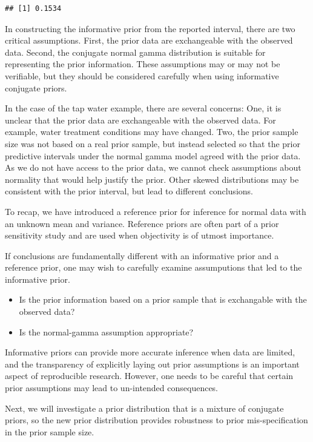 \documentclass[]{book}
\theoremstyle{definition}
\theoremstyle{definition}
\theoremstyle{definition}
\theoremstyle{remark}
\begin{document}
\begin{verbatim}
## [1] 0.1534
\end{verbatim}

In constructing the informative prior from the reported interval, there
are two critical assumptions. First, the prior data are exchangeable
with the observed data. Second, the conjugate normal gamma distribution
is suitable for representing the prior information. These assumptions
may or may not be verifiable, but they should be considered carefully
when using informative conjugate priors.

In the case of the tap water example, there are several concerns: One,
it is unclear that the prior data are exchangeable with the observed
data. For example, water treatment conditions may have changed. Two, the
prior sample size was not based on a real prior sample, but instead
selected so that the prior predictive intervals under the normal gamma
model agreed with the prior data. As we do not have access to the prior
data, we cannot check assumptions about normality that would help
justify the prior. Other skewed distributions may be consistent with the
prior interval, but lead to different conclusions.

To recap, we have introduced a reference prior for inference for normal
data with an unknown mean and variance. Reference priors are often part
of a prior sensitivity study and are used when objectivity is of utmost
importance.

If conclusions are fundamentally different with an informative prior and
a reference prior, one may wish to carefully examine assumputions that
led to the informative prior.

\begin{itemize}
\item
  Is the prior information based on a prior sample that is exchangable
  with the observed data?
\item
  Is the normal-gamma assumption appropriate?
\end{itemize}

Informative priors can provide more accurate inference when data are
limited, and the transparency of explicitly laying out prior assumptions
is an important aspect of reproducible research. However, one needs to
be careful that certain prior assumptions may lead to un-intended
consequences.

Next, we will investigate a prior distribution that is a mixture of
conjugate priors, so the new prior distribution provides robustness to
prior mis-specification in the prior sample size.
\end{document}
